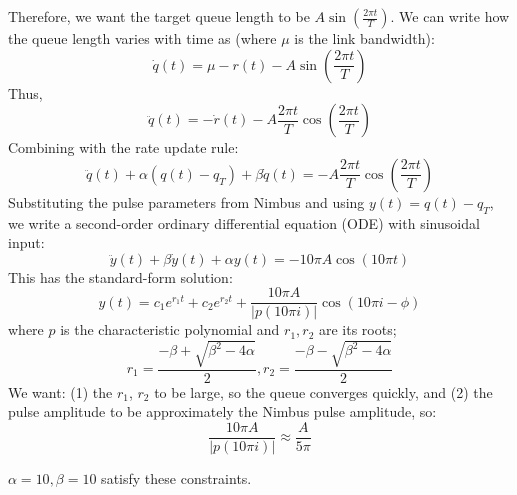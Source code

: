 \begin{appendix}
Therefore, we want the target queue length to be $A \sin(\frac{2\pi{}t}{T})$. 
We can write how the queue length varies with time as (where $\mu$ is the link bandwidth):
    \vspace{-5pt}
\begin{equation} 
    \dot{q}(t) = \mu - r(t) - A \sin(\frac{2\pi{}t}{T})
\end{equation}
%
\noindent Thus, 
%
\begin{equation}
    \ddot{q}(t) = - \dot{r}(t) - A \frac{2\pi{}t}{T} \cos(\frac{2\pi{}t}{T})
\end{equation}
%
\noindent Combining with the rate update rule:
%
\begin{equation}
    \ddot{q}(t) + \alpha (q(t) - q_T) + \beta \dot{q}(t) = - A \frac{2\pi{}t}{T} \cos(\frac{2\pi{}t}{T})
\end{equation}
%
\noindent Substituting the pulse parameters from Nimbus and using $y(t) = q(t) - q_T$, we write a second-order ordinary differential equation (ODE) with sinusoidal input:
%
\begin{equation}
    \ddot{y}(t) + \beta \dot{y}(t) + \alpha y(t) = - 10\pi{}A \cos(10\pi{}t)
\end{equation}
%
\noindent This has the standard-form solution:
%
\begin{equation}
    y(t) = c_1 e^{r_1 t} + c_2 e^{r_2 t} + \frac{10\pi{}A}{|p(10\pi{}i)|} \cos(10\pi{}i - \phi)
\end{equation}
%        
where $p$ is the characteristic polynomial and $r_1, r_2$ are its roots;
\ie 
\begin{equation}
r_1 = \frac{-\beta + \sqrt{\beta^2 - 4\alpha}}{2}, r_2 = \frac{-\beta - \sqrt{\beta^2 - 4\alpha}}{2}
\end{equation}
%
\noindent We want: (1) the $r_1$, $r_2$ to be large, so the queue converges quickly, and (2) the pulse amplitude to be approximately the Nimbus pulse amplitude, so:
%
\begin{equation}
\frac{10\pi{}A}{|p(10\pi{}i)|} \approx \frac{A}{5\pi}
\end{equation}

\noindent $\alpha = 10, \beta = 10$ satisfy these constraints.
\end{appendix}
